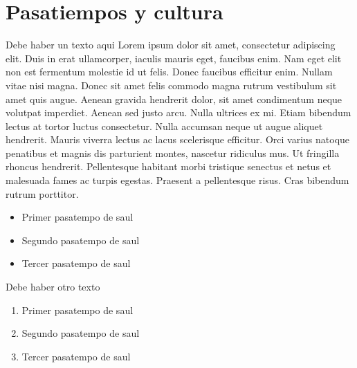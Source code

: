 	\section{Pasatiempos y cultura}
		Debe haber un texto aqui
			Lorem ipsum dolor sit amet, consectetur adipiscing elit. Duis in erat 		ullamcorper, iaculis mauris eget, faucibus enim. Nam eget elit non est 		fermentum molestie id ut felis. Donec faucibus efficitur enim. Nullam 		vitae 		nisi magna. Donec sit amet felis commodo magna rutrum 			vestibulum sit amet quis augue. Aenean gravida hendrerit dolor, sit amet 		condimentum neque volutpat imperdiet. Aenean sed justo arcu. Nulla 			ultrices ex mi. Etiam bibendum lectus at tortor luctus consectetur. Nulla 	accumsan neque ut augue aliquet hendrerit. Mauris viverra lectus ac lacus 	scelerisque efficitur. Orci varius natoque penatibus et magnis dis 			parturient montes, nascetur ridiculus mus. Ut fringilla rhoncus   			hendrerit. Pellentesque habitant morbi tristique senectus et netus et  		malesuada fames ac turpis egestas. Praesent a pellentesque risus. Cras 		bibendum rutrum porttitor.		
		\begin{itemize}
			\item  Primer pasatempo de saul
			\item  Segundo pasatempo de saul
			\item  Tercer pasatempo de saul
		\end{itemize}
		Debe haber otro texto
		\begin{enumerate}
			\item  Primer pasatempo de saul
			\item  Segundo pasatempo de saul
			\item  Tercer pasatempo de saul
		\end{enumerate}
